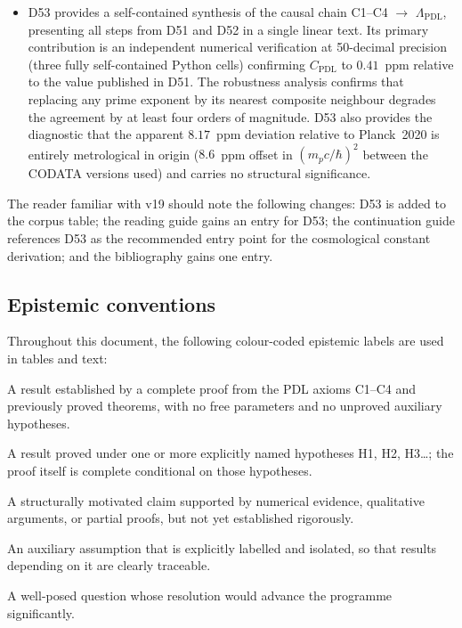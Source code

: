 \documentclass[11pt,a4paper]{article}
\theoremstyle{plain}
\theoremstyle{definition}
\theoremstyle{remark}
\begin{document}
\begin{itemize}
\item D53 provides a self-contained synthesis of the causal chain C1--C4 $\to$ $\Lambda_{\mathrm{PDL}}$, presenting all steps from D51 and D52 in a single linear text. Its primary contribution is an independent numerical verification at 50-decimal precision (three fully self-contained Python cells) confirming $C_{\mathrm{PDL}}$ to $0.41$~ppm relative to the value published in D51. The robustness analysis confirms that replacing any prime exponent by its nearest composite neighbour degrades the agreement by at least four orders of magnitude. D53 also provides the diagnostic that the apparent $8.17$~ppm deviation relative to Planck~2020 is entirely metrological in origin ($8.6$~ppm offset in $(m_p c/\hbar)^2$ between the CODATA versions used) and carries no structural significance.
\end{itemize}

The reader familiar with v19 should note the following changes: D53 is added to the corpus table; the reading guide gains an entry for D53; the continuation guide references D53 as the recommended entry point for the cosmological constant derivation; and the bibliography gains one entry.

\subsection{Epistemic conventions}
\label{subsec:conventions}
Throughout this document, the following colour-coded epistemic labels are used in tables and text:
\begin{description}[leftmargin=2.5cm, style=nextline]
\item[\textcolor{proofblue}{Theorem}] A result established by a complete proof from the PDL axioms C1--C4 and previously proved theorems, with no free parameters and no unproved auxiliary hypotheses.
\item[\textcolor{proofblue}{Theorem (H$x$)}] A result proved under one or more explicitly named hypotheses H1, H2, H3\ldots; the proof itself is complete conditional on those hypotheses.
\item[\textcolor{conjecturegreen}{Conjecture}] A structurally motivated claim supported by numerical evidence, qualitative arguments, or partial proofs, but not yet established rigorously.
\item[\textcolor{hypothesisorange}{Named Hypothesis}] An auxiliary assumption that is explicitly labelled and isolated, so that results depending on it are clearly traceable.
\item[\textcolor{openproblemred}{Open Problem}] A well-posed question whose resolution would advance the programme significantly.
\end{description}
\end{document}

